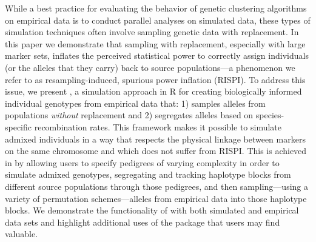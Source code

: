 

While a best practice for evaluating the behavior of genetic clustering algorithms 
on empirical data is to conduct parallel analyses on simulated data, these types 
of simulation techniques often involve sampling genetic data with replacement. 
In this paper we demonstrate that sampling with replacement, especially with large 
marker sets, inflates the perceived statistical power to correctly assign individuals
(or the alleles that they carry)
back to source populations---a phenomenon we refer to as resampling-induced, 
spurious power inflation (RISPI). To address this issue, we present \gscramble{}, a 
simulation approach in R for creating biologically informed individual genotypes from 
empirical data that: 1) samples alleles from populations \textit{without} replacement and 
2) segregates alleles based on species-specific recombination rates. This framework
makes it possible to simulate admixed individuals in a way that respects the physical
linkage between markers on the same chromosome and which does not suffer
from RISPI.  This is achieved in \gscramble{} by allowing 
users to specify pedigrees of varying complexity 
in order to simulate admixed genotypes, segregating and tracking haplotype blocks 
from different source populations through those pedigrees, and then sampling---using
a variety of permutation schemes---alleles from empirical data into those haplotype blocks.
We demonstrate the functionality of 
\gscramble{} with both simulated and empirical data sets and highlight additional uses of 
the package that users may find valuable.
